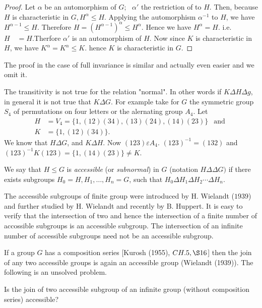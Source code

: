 \begin{proof}
  Let $\alpha$ be an automorphism of $G$;~ $\alpha'$ the restriction
  of to $H$. Then, because $H$ is characteristic in $G, H^\alpha \leq
  H$. Applying the automorphism $\alpha^{-1}$ to $H$, we have
  $H^{\alpha-1} \leq H$. Therefore $H=(H^{\alpha-1})^\alpha \leq
  H^\alpha$. Hence we have $H^\alpha = H$. i.e. $H \quad =H$.Therfore
  $\alpha'$ is an automorphism of $H$. Now since $K$ is characteristic
  in $H$, we have $K^\alpha = K^\alpha \leq K$. hence $K$ is
  characteristic in $G$. 
\end{proof} 
 
The proof in the case of full invariance is similar and actually even
easier and we omit it. 
 
The transitivity is not true for the relation "normal". In other words
if $K \Delta H \Delta g$, in general it is not true that $K \Delta
G$. For example take for $G$ the symmetric group $S_4$ of permutations
on four letters or the alernating group $A_4$. Let 
\begin{align*}
  H & = V_4 = \bigg\{ 1, (12)(34), (13)(24), (14)(23)\bigg \} ~~\text{ and } \\
  K & = \bigg \{1, (12) (34)\bigg \}.
\end{align*} 
 We know that $H \Delta G$, and $K \Delta H$. Now $(123) \varepsilon
 A_4$. $(123)^{-1} = (132)$ and $(123)^{-1}K(123) = \bigg \{1, (14)
 (23)\bigg \} \neq K$. 
 
We say that $H \leq G$ is \textit{accessible} (or \textit{subnormal})
in $G$ (notation $H \Delta \Delta G)$ if there exists subgroups $H_0 =
H, H_1,\ldots, H_n = G$, such that $H_0 \Delta H_1 \Delta H_2 \cdots
\Delta H_n $. 
 
The accessible subgroups of finite group were introduced by
H. Wielandt ($1939$) and further studied by H. Wielandt and recently
by B. Huppert. It is easy to verify that the intersection of two and
hence the intersection of a finite number of accossible subgroups is
an accessible subgroup. The intersection of an infinite number of
accessible subgroups need not be an accessible subgroup. 
 
If a group $G$ has a composition series [Kurosh (1955), $CH. 5, \S
  16$] then the join of any two accessible groups is again an
accessible group (Wielandt (1939)). The following is an unsolved
problem. 
 
\begin{unsolved problem}
  Is the join of two accessible subgroup of an infinite group (without
  composition series) accessible? 
\end{unsolved problem} 
 
